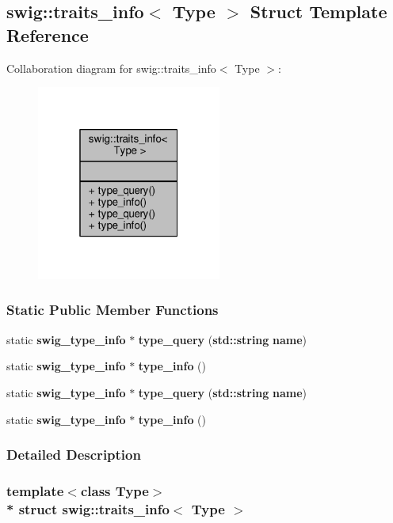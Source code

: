 \subsection{swig\+:\+:traits\+\_\+info$<$ Type $>$ Struct Template Reference}
\label{structswig_1_1traits__info}


Collaboration diagram for swig\+:\+:traits\+\_\+info$<$ Type $>$\+:
\nopagebreak
\begin{figure}[H]
\begin{center}
\leavevmode
\includegraphics[width=172pt]{de/d68/structswig_1_1traits__info__coll__graph}
\end{center}
\end{figure}
\subsubsection*{Static Public Member Functions}
\begin{DoxyCompactItemize}
\item 
static {\bf swig\+\_\+type\+\_\+info} $\ast$ {\bf type\+\_\+query} ({\bf std\+::string} {\bf name})
\item 
static {\bf swig\+\_\+type\+\_\+info} $\ast$ {\bf type\+\_\+info} ()
\item 
static {\bf swig\+\_\+type\+\_\+info} $\ast$ {\bf type\+\_\+query} ({\bf std\+::string} {\bf name})
\item 
static {\bf swig\+\_\+type\+\_\+info} $\ast$ {\bf type\+\_\+info} ()
\end{DoxyCompactItemize}


\subsubsection{Detailed Description}
\subsubsection*{template$<$class Type$>$\\*
struct swig\+::traits\+\_\+info$<$ Type $>$}



